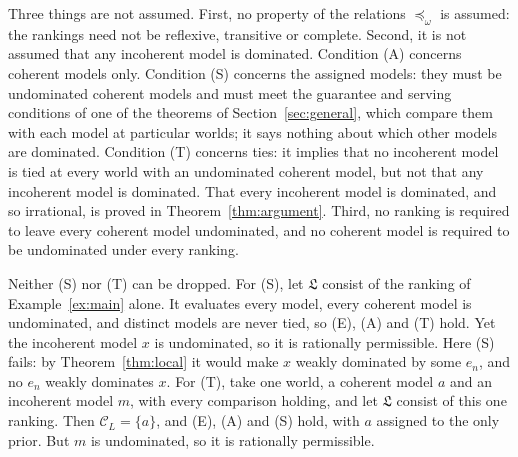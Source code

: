 \documentclass[11pt]{article}
\theoremstyle{definition}
\theoremstyle{remark}
\newcommand{\C}{\mathcal C}
\newcommand{\Lf}{\mathfrak L}
\begin{document}
Three things are not assumed. First, no property of the relations $\preceq_\omega$ is assumed: the rankings need not be reflexive, transitive or complete. Second, it is not assumed that any incoherent model is dominated. Condition (A) concerns coherent models only. Condition (S) concerns the assigned models: they must be undominated coherent models and must meet the guarantee and serving conditions of one of the theorems of Section~\ref{sec:general}, which compare them with each model at particular worlds; it says nothing about which other models are dominated. Condition (T) concerns ties: it implies that no incoherent model is tied at every world with an undominated coherent model, but not that any incoherent model is dominated. That every incoherent model is dominated, and so irrational, is proved in Theorem~\ref{thm:argument}. Third, no ranking is required to leave every coherent model undominated, and no coherent model is required to be undominated under every ranking.

Neither (S) nor (T) can be dropped. For (S), let $\Lf$ consist of the ranking of Example~\ref{ex:main} alone. It evaluates every model, every coherent model is undominated, and distinct models are never tied, so (E), (A) and (T) hold. Yet the incoherent model $x$ is undominated, so it is rationally permissible. Here (S) fails: by Theorem~\ref{thm:local} it would make $x$ weakly dominated by some $e_n$, and no $e_n$ weakly dominates $x$. For (T), take one world, a coherent model $a$ and an incoherent model $m$, with every comparison holding, and let $\Lf$ consist of this one ranking. Then $\C_L=\{a\}$, and (E), (A) and (S) hold, with $a$ assigned to the only prior. But $m$ is undominated, so it is rationally permissible.
\end{document}
